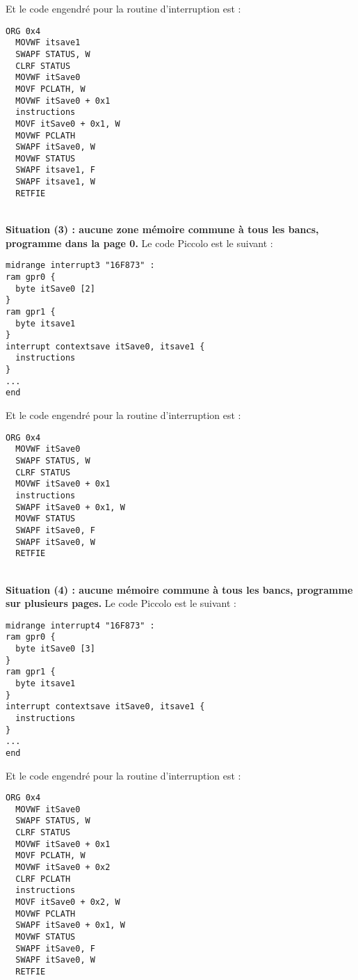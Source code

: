 Et le code engendré pour la routine d'interruption est :
\begin{lstlisting}[language=assembleur]
  ORG 0x4
  MOVWF itsave1
  SWAPF STATUS, W
  CLRF STATUS
  MOVWF itSave0
  MOVF PCLATH, W
  MOVWF itSave0 + 0x1
  instructions
  MOVF itSave0 + 0x1, W
  MOVWF PCLATH
  SWAPF itSave0, W
  MOVWF STATUS
  SWAPF itsave1, F
  SWAPF itsave1, W
  RETFIE
\end{lstlisting}







~\\
\textbf{Situation (3) : aucune zone mémoire commune à tous les bancs, programme dans la page 0.} Le code Piccolo est le suivant :
\begin{lstlisting}[language=piccolo]
midrange interrupt3 "16F873" :
ram gpr0 {
  byte itSave0 [2]
}
ram gpr1 {
  byte itsave1
}
interrupt contextsave itSave0, itsave1 {
  instructions
}
...
end
\end{lstlisting}

Et le code engendré pour la routine d'interruption est :
\begin{lstlisting}[language=assembleur]
  ORG 0x4
  MOVWF itSave0
  SWAPF STATUS, W
  CLRF STATUS
  MOVWF itSave0 + 0x1
  instructions
  SWAPF itSave0 + 0x1, W
  MOVWF STATUS
  SWAPF itSave0, F
  SWAPF itSave0, W
  RETFIE
\end{lstlisting}





~\\
\textbf{Situation (4) : aucune mémoire commune à tous les bancs, programme sur plusieurs pages.} Le code Piccolo est le suivant :
\begin{lstlisting}[language=piccolo]
midrange interrupt4 "16F873" :
ram gpr0 {
  byte itSave0 [3]
}
ram gpr1 {
  byte itsave1
}
interrupt contextsave itSave0, itsave1 {
  instructions
}
...
end
\end{lstlisting}

Et le code engendré pour la routine d'interruption est :
\begin{lstlisting}[language=assembleur]
  ORG 0x4
  MOVWF itSave0
  SWAPF STATUS, W
  CLRF STATUS
  MOVWF itSave0 + 0x1
  MOVF PCLATH, W
  MOVWF itSave0 + 0x2
  CLRF PCLATH
  instructions
  MOVF itSave0 + 0x2, W
  MOVWF PCLATH
  SWAPF itSave0 + 0x1, W
  MOVWF STATUS
  SWAPF itSave0, F
  SWAPF itSave0, W
  RETFIE\end{lstlisting}




